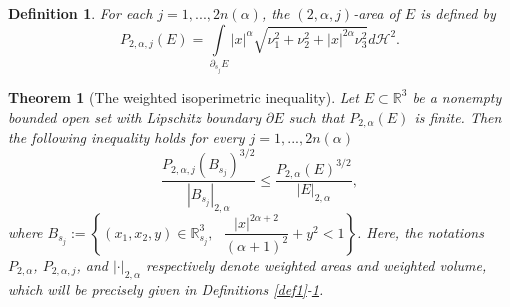 \documentclass[10pt,a4paper]{amsart}
\newtheorem{theorem}{Theorem}
\newtheorem{definition}{Definition}
\begin{document}
	\begin{definition}\label{def3}
		For each $j=1,...,2n(\alpha)$, the $(2,\alpha,j)$-area of $E$ is defined by
		$$ P_{2,\alpha,j} (E) = \int\limits_{\partial_{s_j} E} |x|^\alpha \sqrt{ \nu_1^2 + \nu_2^2 + |x|^{2\alpha} \nu_3^2}d\mathcal{H}^2.$$ 
	\end{definition}

	\begin{theorem}[The weighted isoperimetric inequality]\label{thm1}
		Let $E \subset \mathbb{R}^3$ be a nonempty bounded open set with Lipschitz boundary $\partial E$ such that $P_{2,\alpha} (E)$ is finite. Then the following inequality holds for every $j=1,...,2n(\alpha)$
		\begin{equation}\label{eqn2}
			\dfrac{P_{2,\alpha,j}(B_{s_j})^{3/2}}{|B_{s_j}|_{2,\alpha}} \leq \dfrac{P_{2,\alpha}(E)^{3/2}}{|E|_{2,\alpha}},
		\end{equation}
		where $B_{s_j} := \left\{ (x_1,x_2,y) \in \mathbb{R}^3_{s_j}, \textrm{ }\dfrac{|x|^{2\alpha+2}}{(\alpha+1)^2} + y^2 < 1 \right\}$. Here, the notations $P_{2,\alpha}$, $P_{2,\alpha,j}$, and $|\cdot|_{2,\alpha}$ respectively denote weighted areas and weighted volume, which will be precisely given in Definitions \ref{def1}-\ref{def3}. 
	\end{theorem}
\end{document}
